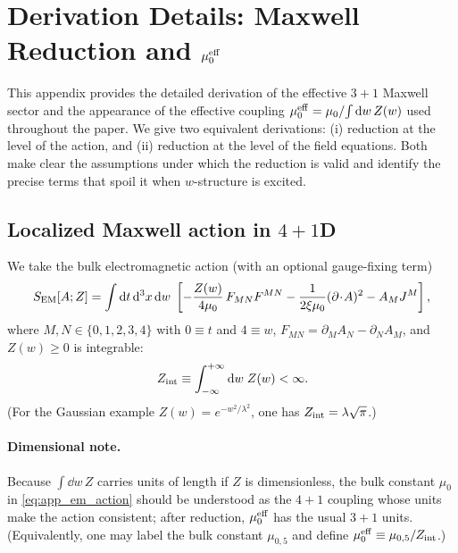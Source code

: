 \documentclass[11pt]{article}
\begin{document}
\section{Derivation Details: Maxwell Reduction and \texorpdfstring{$\mu_0^{\rm eff}$}{mu0eff}}
\label{app:maxwell_reduction}

This appendix provides the detailed derivation of the effective \(3+1\) Maxwell sector
and the appearance of the effective coupling
\(\mu_0^{\rm eff}=\mu_0/\!\int \dd w\,Z(w)\) used throughout the paper.
We give two equivalent derivations:
(i) reduction at the level of the action, and
(ii) reduction at the level of the field equations.
Both make clear the assumptions under which the reduction is valid and identify
the precise terms that spoil it when \(w\)-structure is excited.

\subsection{Localized Maxwell action in \texorpdfstring{\(4+1\)}{4+1}D}
\label{app:maxwell_action}

We take the bulk electromagnetic action (with an optional gauge-fixing term)
\begin{equation}
S_{\rm EM}[A;Z]
=
\int \dd t\,\dd^3x\,\dd w\;
\left[
-\frac{Z(w)}{4\mu_0}\,F_{MN}F^{MN}
-\frac{1}{2\xi\mu_0}(\partial\!\cdot\!A)^2
- A_M J^M
\right],
\label{eq:app_em_action}
\end{equation}
where \(M,N\in\{0,1,2,3,4\}\) with \(0\equiv t\) and \(4\equiv w\),
\(F_{MN}=\partial_M A_N-\partial_N A_M\), and \(Z(w)\ge 0\) is integrable:
\begin{equation}
Z_{\rm int}\equiv \int_{-\infty}^{+\infty}\dd w\;Z(w) < \infty.
\label{eq:app_Zint}
\end{equation}
(For the Gaussian example \(Z(w)=e^{-w^2/\lambda^2}\), one has \(Z_{\rm int}=\lambda\sqrt{\pi}\).)

\paragraph{Dimensional note.}
Because \(\int \dd w\,Z\) carries units of length if \(Z\) is dimensionless, the bulk
constant \(\mu_0\) in \eqref{eq:app_em_action} should be understood as the \(4+1\) coupling
whose units make the action consistent; after reduction, \(\mu_0^{\rm eff}\) has the usual
\(3+1\) units. (Equivalently, one may label the bulk constant \(\mu_{0,5}\) and define
\(\mu_0^{\rm eff}\equiv \mu_{0,5}/Z_{\rm int}\).)
\end{document}
